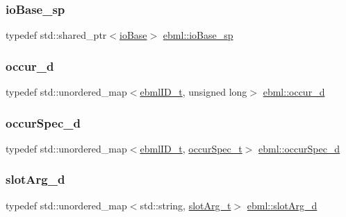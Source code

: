 \mbox{\label{namespaceebml_a7bb59128ac6af27e47367938a846b569}} 
\subsubsection{\texorpdfstring{io\+Base\+\_\+sp}{ioBase\_sp}}
{\footnotesize\ttfamily typedef std\+::shared\+\_\+ptr$<$\mbox{\hyperlink{classebml_1_1ioBase}{io\+Base}}$>$ \mbox{\hyperlink{namespaceebml_a7bb59128ac6af27e47367938a846b569}{ebml\+::io\+Base\+\_\+sp}}}

\mbox{\label{namespaceebml_a4ecb956f78f49ef5e24e0d0db9b646f4}} 
\subsubsection{\texorpdfstring{occur\+\_\+d}{occur\_d}}
{\footnotesize\ttfamily typedef std\+::unordered\+\_\+map$<$\mbox{\hyperlink{namespaceebml_a86c5f604ddf12a74aa9812e997a58691}{ebml\+I\+D\+\_\+t}}, unsigned long$>$ \mbox{\hyperlink{namespaceebml_a4ecb956f78f49ef5e24e0d0db9b646f4}{ebml\+::occur\+\_\+d}}}

\mbox{\label{namespaceebml_a1cd7dafb7e8e8975fecc4a11ef03c5be}} 
\subsubsection{\texorpdfstring{occur\+Spec\+\_\+d}{occurSpec\_d}}
{\footnotesize\ttfamily typedef std\+::unordered\+\_\+map$<$\mbox{\hyperlink{namespaceebml_a86c5f604ddf12a74aa9812e997a58691}{ebml\+I\+D\+\_\+t}}, \mbox{\hyperlink{structebml_1_1occurSpec__t}{occur\+Spec\+\_\+t}}$>$ \mbox{\hyperlink{namespaceebml_a1cd7dafb7e8e8975fecc4a11ef03c5be}{ebml\+::occur\+Spec\+\_\+d}}}

\mbox{\label{namespaceebml_a4317d4c495715eced3ed448c2d05caeb}} 
\subsubsection{\texorpdfstring{slot\+Arg\+\_\+d}{slotArg\_d}}
{\footnotesize\ttfamily typedef std\+::unordered\+\_\+map$<$std\+::string, \mbox{\hyperlink{classebml_1_1slotArg__t}{slot\+Arg\+\_\+t}}$>$ \mbox{\hyperlink{namespaceebml_a4317d4c495715eced3ed448c2d05caeb}{ebml\+::slot\+Arg\+\_\+d}}}


